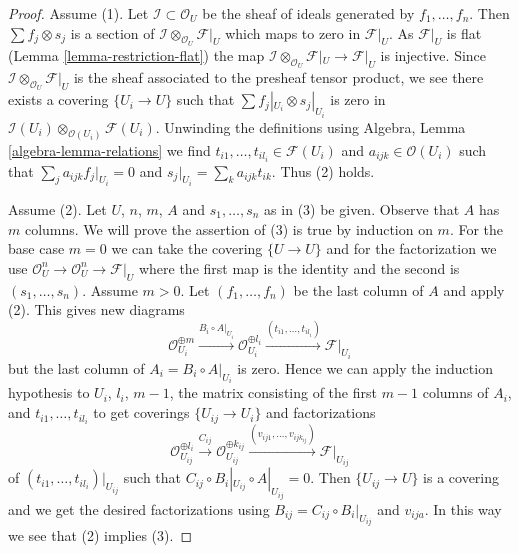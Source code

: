 \begin{proof}
Assume (1). Let $\mathcal{I} \subset \mathcal{O}_U$ be the sheaf of ideals
generated by $f_1, \ldots, f_n$. Then $\sum f_j \otimes s_j$ is
a section of $\mathcal{I} \otimes_{\mathcal{O}_U} \mathcal{F}|_U$
which maps to zero in $\mathcal{F}|_U$. As $\mathcal{F}|_U$ is flat
(Lemma \ref{lemma-restriction-flat}) the map
$\mathcal{I} \otimes_{\mathcal{O}_U} \mathcal{F}|_U \to \mathcal{F}|_U$
is injective. Since $\mathcal{I} \otimes_{\mathcal{O}_U} \mathcal{F}|_U$
is the sheaf associated to the presheaf tensor product, we see
there exists a covering $\{U_i \to U\}$ such
that $\sum f_j|_{U_i} \otimes s_j|_{U_i}$ is zero in
$\mathcal{I}(U_i) \otimes_{\mathcal{O}(U_i)} \mathcal{F}(U_i)$.
Unwinding the definitions using Algebra, Lemma \ref{algebra-lemma-relations}
we find $t_{i1}, \ldots, t_{i l_i} \in \mathcal{F}(U_i)$ and
$a_{ijk} \in \mathcal{O}(U_i)$
such that $\sum_j a_{ijk}f_j|_{U_i} = 0$ and
$s_j|_{U_i} = \sum_k a_{ijk}t_{ik}$.
Thus (2) holds.

\medskip\noindent
Assume (2). Let $U$, $n$, $m$, $A$ and $s_1, \ldots, s_n$ as in (3) be given.
Observe that $A$ has $m$ columns. We will prove the assertion of (3)
is true by induction on $m$. For the base case $m = 0$ we
can take the covering $\{U \to U\}$ and for the factorization we use
$\mathcal{O}_U^n \to \mathcal{O}_U^n \to \mathcal{F}|_U$ where
the first map is the identity and the second is $(s_1, \ldots, s_n)$.
Assume $m > 0$. Let $(f_1, \ldots, f_n)$ be the last column of $A$
and apply (2). This gives new diagrams
$$
\mathcal{O}_{U_i}^{\oplus m} \xrightarrow{B_i \circ A|_{U_i}}
\mathcal{O}_{U_i}^{\oplus l_i} \xrightarrow{(t_{i1}, \ldots, t_{il_i})}
\mathcal{F}|_{U_i}
$$
but the last column of $A_i = B_i \circ A|_{U_i}$ is zero.
Hence we can apply the induction hypothesis to
$U_i$, $l_i$, $m - 1$, the matrix consisting of
the first $m - 1$ columns of $A_i$, and $t_{i1}, \ldots, t_{il_i}$
to get coverings $\{U_{ij} \to U_i\}$ and factorizations
$$
\mathcal{O}_{U_{ij}}^{\oplus l_i}
\xrightarrow{C_{ij}}
\mathcal{O}_{U_{ij}}^{\oplus k_{ij}}
\xrightarrow{(v_{ij1}, \ldots, v_{ij k_{ij}})}
\mathcal{F}|_{U_{ij}}
$$
of $(t_{i1}, \ldots, t_{il_i})|_{U_{ij}}$ such that
$C_{ij} \circ B_i|_{U_{ij}} \circ A|_{U_{ij}} = 0$.
Then $\{U_{ij} \to U\}$ is a covering and we get the
desired factorizations
using $B_{ij} = C_{ij} \circ B_i|_{U_{ij}}$ and
$v_{ija}$. In this way we see that (2) implies (3).


\end{proof}
